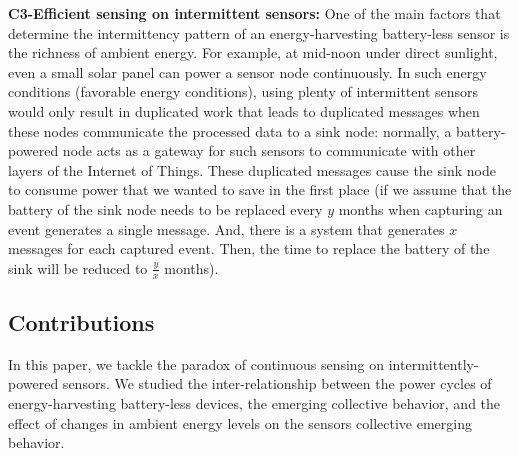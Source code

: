 \noindent\textbf{C3-Efficient sensing on intermittent sensors:} 
One of the main factors that determine the intermittency pattern of an energy-harvesting battery-less sensor is the richness of ambient energy. For example, at mid-noon under direct sunlight, even a small solar panel can power a sensor node continuously. 
In such energy conditions (favorable energy conditions), using plenty of intermittent sensors would only result in duplicated work that leads to duplicated messages when these nodes communicate the processed data to a sink node: normally, a battery-powered node acts as a gateway for such sensors to communicate with other layers of the Internet of Things. These duplicated messages cause the sink node to consume power that we wanted to save in the first place (if we assume that the battery of the sink node needs to be replaced every $y$ months when capturing an event generates a single message. And,  there is a system that generates $x$ messages for each captured event. Then, the time to replace the battery of the sink will be reduced to  $\frac{y}{x}$ months).






\subsection{Contributions}
%
In this paper, we tackle the paradox of continuous sensing on intermittently-powered sensors. 
We studied the inter-relationship between the power cycles of energy-harvesting battery-less devices, 
the emerging collective behavior, and the effect of changes in ambient energy levels on the sensors collective emerging behavior. 



